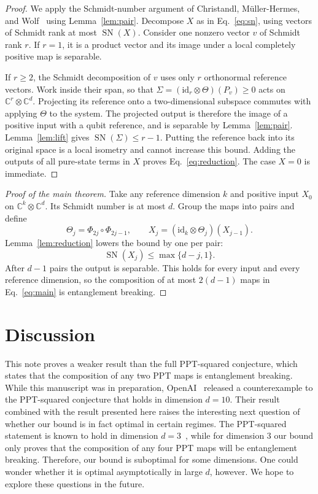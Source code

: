\documentclass[aps,prl,reprint,superscriptaddress,longbibliography,raggedbottom]{revtex4-2}
\newcommand{\C}{\mathbb C}
\newcommand{\id}{\mathrm{id}}
\newcommand{\SN}{\operatorname{SN}}
\begin{document}
\begin{proof}
We apply the Schmidt-number argument of Christandl, M\"uller-Hermes,
and Wolf~\cite[Lemma~II.1 and proof of Theorem~II.1]{CMHW19}
using Lemma~\ref{lem:pair}.
Decompose $X$ as in Eq.~\eqref{eq:sn}, using vectors of Schmidt rank
at most $\SN(X)$. Consider one nonzero vector $v$ of Schmidt rank $r$.
If $r=1$, it is a product vector and its image under a local completely
positive map is separable.

If $r\ge2$, the Schmidt decomposition of $v$ uses only $r$ orthonormal
reference vectors. Work inside their span, so that
$\Sigma=(\id_r\otimes\Theta)(P_v)\ge0$ acts on
$\C^r\otimes\C^d$. Projecting its reference onto a two-dimensional
subspace commutes with applying $\Theta$ to the system. The projected
output is therefore the image of a positive input with a qubit
reference, and is separable by Lemma~\ref{lem:pair}.
Lemma~\ref{lem:lift} gives $\SN(\Sigma)\le r-1$.
Putting the reference back into its original space is a local isometry
and cannot increase this bound. Adding the outputs of all pure-state
terms in $X$ proves Eq.~\eqref{eq:reduction}. The case $X=0$ is immediate.
\end{proof}

\begin{proof}[Proof of the main theorem]
Take any reference dimension $k$ and positive input $X_0$ on
$\C^k\otimes\C^d$. Its Schmidt number is at most $d$.
Group the maps into pairs and define
\begin{equation}\label{eq:iteration}
\Theta_j=\Phi_{2j}\circ\Phi_{2j-1},\qquad
X_j=(\id_k\otimes\Theta_j)(X_{j-1}).
\end{equation}
Lemma~\ref{lem:reduction} lowers the bound by one per pair:
\begin{equation}\label{eq:bound}
\SN(X_j)\le\max\{d-j,1\}.
\end{equation}
After $d-1$ pairs the output is separable. This holds for every input
and every reference dimension, so the composition of at most $2(d-1)$ maps
in Eq.~\eqref{eq:main} is entanglement breaking.
\end{proof}

\section{Discussion}
This note proves a weaker result than the full PPT-squared conjecture, which states that the composition of any two PPT maps is entanglement breaking. While this manuscript was in preparation, OpenAI~\cite{OpenAI26} released a counterexample to the PPT-squared conjecture that holds in dimension $d=10$. Their result combined with the result presented here raises the interesting next question of whether our bound is in fact optimal in certain regimes. The PPT-squared statement is known to hold in dimension $d=3$~\cite{CMHW19,CYT19}, while for dimension $3$ our bound only proves that the composition of any four PPT maps will be entanglement breaking. Therefore, our bound is suboptimal for some dimensions. One could wonder whether it is optimal asymptotically in large $d$, however. We hope to explore these questions in the future. 

\end{document}
